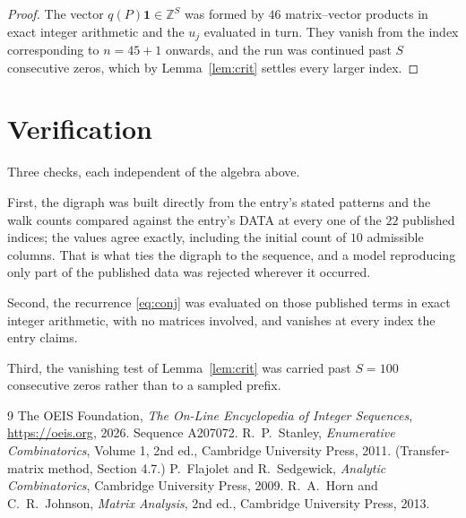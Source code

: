 \documentclass[11pt,a4paper]{article}
\theoremstyle{plain}
\theoremstyle{definition}
\begin{document}
\begin{proof}
The vector $q(P)\mathbf{1}\in\mathbb{Z}^{S}$ was formed by $46$ matrix--vector
products in exact integer arithmetic and the $u_j$ evaluated in turn. They vanish from the
index corresponding to $n=45+1$ onwards, and the run was continued past $S$ consecutive
zeros, which by Lemma~\ref{lem:crit} settles every larger index.
\end{proof}

\section{Verification}

Three checks, each independent of the algebra above.

First, the digraph was built directly from the entry's stated patterns and the walk counts
compared against the entry's DATA at every one of the $22$ published indices; the
values agree exactly, including the initial count of $10$ admissible columns. That is
what ties the digraph to the sequence, and a model reproducing only part of the published
data was rejected wherever it occurred.

Second, the recurrence \eqref{eq:conj} was evaluated on those published terms in exact
integer arithmetic, with no matrices involved, and vanishes at every index the entry claims.

Third, the vanishing test of Lemma~\ref{lem:crit} was carried past $S=100$ consecutive
zeros rather than to a sampled prefix.

\begin{thebibliography}{9}
 The OEIS Foundation, \emph{The On-Line Encyclopedia of Integer
Sequences}, \url{https://oeis.org}, 2026. Sequence A207072.
 R.~P.~Stanley, \emph{Enumerative Combinatorics}, Volume 1, 2nd ed.,
Cambridge University Press, 2011. (Transfer-matrix method, Section 4.7.)
 P.~Flajolet and R.~Sedgewick, \emph{Analytic Combinatorics}, Cambridge
University Press, 2009.
 R.~A.~Horn and C.~R.~Johnson, \emph{Matrix Analysis}, 2nd ed., Cambridge
University Press, 2013.
\end{thebibliography}
\end{document}
